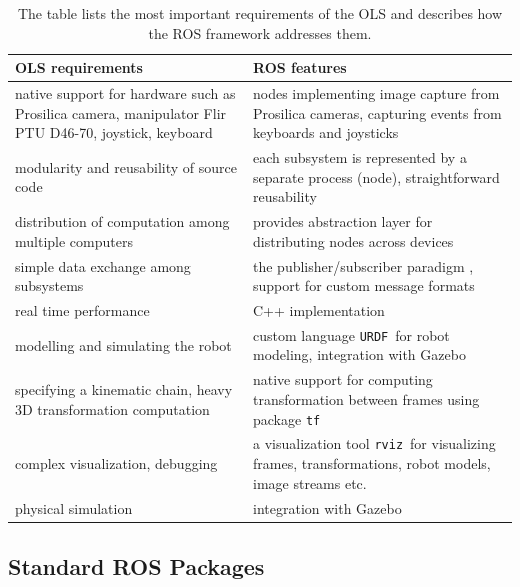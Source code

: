 {\renewcommand{\arraystretch}{1.5}
	\begin{table}[htbp]
		\centering
		\caption{The table lists the most important requirements of the OLS and describes how the ROS framework addresses them.}
		\begin{tabularx}{0.99\textwidth}{XX}
			\toprule
			\textbf{OLS requirements} & \textbf{ROS features} \\
			\midrule
			native support for hardware such as Prosilica camera, manipulator Flir PTU D46-70, joystick, keyboard & nodes implementing image capture from Prosilica cameras, capturing events from keyboards and joysticks \\
			modularity and reusability of source code & each subsystem is represented by a separate process (node), straightforward reusability \\
			distribution of computation among multiple computers & provides abstraction layer for distributing nodes across devices \\
			simple data exchange among subsystems & the publisher/subscriber paradigm \cite{O'Kane201310}, support for custom message formats \\
			real time performance & C++ implementation \\
			modelling and simulating the robot & custom language \texttt{URDF}\footnotemark ~for robot modeling, integration with Gazebo \\
			specifying a kinematic chain, heavy 3D transformation computation & native support for computing transformation between frames using package \texttt{tf} \\
			complex visualization, debugging & a visualization tool \texttt{rviz}\footnotemark ~for visualizing frames, transformations, robot models, image streams etc. \\
			physical simulation & integration with Gazebo \\
			\bottomrule
		\end{tabularx}
		\label{tab:ols_requirements_ros_features}
	\end{table}}
	
	
	\subsection{Standard ROS Packages}
	
